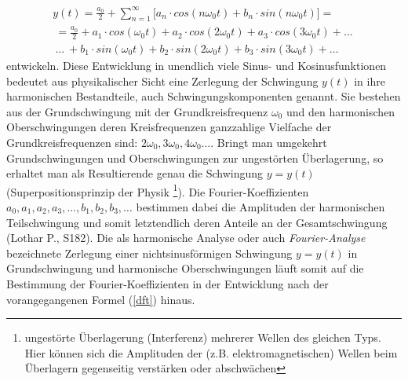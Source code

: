 \documentclass[11pt]{report}
\begin{document}
\begin{equation}\label{dft}
\begin{split}  
y(t) =\frac{a_0}{2}+\sum_{n=1}^{\infty} \lbrack a_n \cdot cos(n \omega_0 t) + b_n \cdot sin(n \omega_0 t) \rbrack = \\\
= \frac{a_0}{2}+a_1 \cdot cos(\omega_0 t) + a_2 \cdot cos(2 \omega_0 t) + a_3 \cdot cos(3 \omega_0 t) + \dots \ \\\
\dots \ + b_1 \cdot sin(\omega_0 t) + b_2 \cdot sin(2 \omega_0 t) + b_3 \cdot sin(3 \omega_0 t) + \dots\ 
\end{split}
\end{equation}
entwickeln. Diese Entwicklung in unendlich viele Sinus- und Kosinusfunktionen bedeutet aus physikalischer Sicht eine Zerlegung der Schwingung $y(t)$ in ihre harmonischen Bestandteile, auch Schwingungskomponenten genannt. Sie bestehen aus der Grundschwingung mit der Grundkreisfrequenz $\omega_0$ und den harmonischen Oberschwingungen deren Kreisfrequenzen ganzzahlige Vielfache der Grundkreisfrequenzen sind: $2\omega_0, 3\omega_0, 4\omega_0 \dots $. Bringt man umgekehrt Grundschwingungen und Oberschwingungen zur ungestörten Überlagerung, so erhaltet man als Resultierende genau die Schwingung $y = y(t)$ (Superpositionsprinzip der Physik \footnote{ungestörte Überlagerung (Interferenz) mehrerer Wellen des gleichen Typs. Hier können sich die Amplituden der (z.B. elektromagnetischen) Wellen beim Überlagern gegenseitig verstärken oder abschwächen}). Die Fourier-Koeffizienten $a_0, a_1, a_2, a_3, \dots, b_1, b_2, b_3, \dots $ bestimmen dabei die Amplituden der harmonischen Teilschwingung und somit letztendlich deren Anteile an der Gesamtschwingung (Lothar P., S182). Die als harmonische Analyse oder auch \emph{Fourier-Analyse} bezeichnete Zerlegung einer nichtsinusförmigen Schwingung $y=y(t)$ in Grundschwingung und harmonische Oberschwingungen läuft somit auf die Bestimmung der Fourier-Koeffizienten in der Entwicklung nach der vorangegangenen Formel (\ref{dft}) hinaus. 
\end{document}
